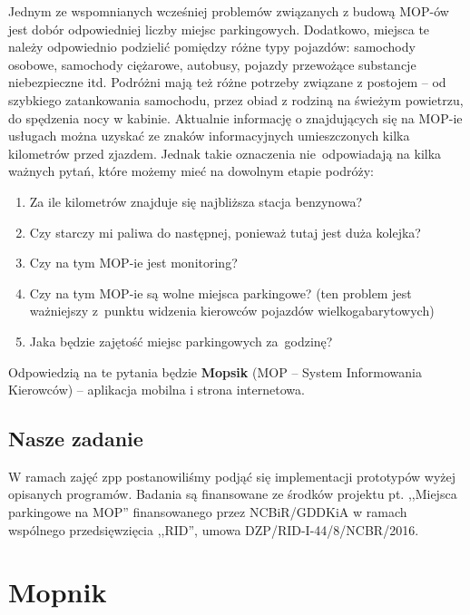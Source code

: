 Jednym ze wspomnianych wcześniej problemów związanych z budową MOP-ów jest dobór odpowiedniej liczby miejsc parkingowych. Dodatkowo, miejsca te należy odpowiednio podzielić pomiędzy różne typy pojazdów: samochody osobowe, samochody ciężarowe, autobusy, pojazdy przewożące substancje niebezpieczne itd. Podróżni mają też różne potrzeby związane z postojem -- od szybkiego zatankowania samochodu, przez obiad z rodziną na świeżym powietrzu, do spędzenia nocy w kabinie. \newline Aktualnie informację o znajdujących się na MOP-ie usługach można uzyskać ze znaków informacyjnych umieszczonych kilka kilometrów przed zjazdem. Jednak takie oznaczenia nie~odpowiadają na kilka ważnych pytań, które możemy mieć na dowolnym etapie podróży:
\begin{enumerate}
	\item Za ile kilometrów znajduje się najbliższa stacja benzynowa? 
	\item Czy starczy mi paliwa do następnej, ponieważ tutaj jest duża kolejka?
	\item Czy na tym MOP-ie jest monitoring?
	\item Czy na tym MOP-ie są wolne miejsca parkingowe? (ten problem jest ważniejszy z~punktu widzenia kierowców pojazdów wielkogabarytowych)
	\item Jaka będzie zajętość miejsc parkingowych za~godzinę?
\end{enumerate}

Odpowiedzią na te pytania będzie \textbf{Mopsik} (MOP -- System Informowania Kierowców) -- aplikacja mobilna i strona internetowa.


\section{Nasze zadanie}
W ramach zajęć \acrshort{zpp} postanowiliśmy podjąć się implementacji prototypów wyżej opisanych programów.
Badania są finansowane ze środków projektu pt. ,,Miejsca parkingowe na MOP'' finansowanego przez NCBiR/GDDKiA w ramach wspólnego przedsięwzięcia ,,RID'', umowa DZP/RID-I-44/8/NCBR/2016.
\chapter{Mopnik}\label{r:Mopnik}

